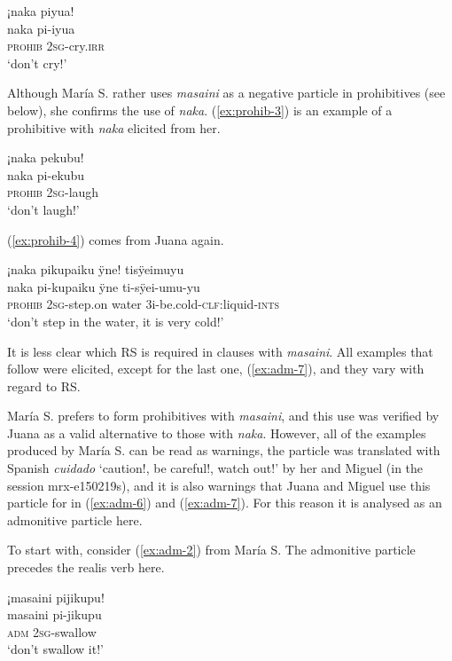 \ea\label{ex:prohib-2}
\begingl
\glpreamble ¡naka piyua!\\
\gla naka pi-iyua\\
\glb \textsc{prohib} 2\textsc{sg}-cry.\textsc{irr}\\
\glft ‘don’t cry!’
\endgl
\trailingcitation{[jxx-p150920l.041]}
\xe

Although María S. rather uses \textit{masaini} as a negative particle in prohibitives (see below), she confirms the use of \textit{naka}. (\ref{ex:prohib-3}) is an example of a prohibitive with \textit{naka} elicited from her.

\ea\label{ex:prohib-3}
\begingl
\glpreamble ¡naka pekubu!\\
\gla naka pi-ekubu\\
\glb \textsc{prohib} 2\textsc{sg}-laugh\\
\glft ‘don’t laugh!’
\endgl
\trailingcitation{[rxx-e150220s-1.08]}
\xe

(\ref{ex:prohib-4}) comes from Juana again.

\ea\label{ex:prohib-4}
\begingl
\glpreamble ¡naka pikupaiku ÿne! tisÿeimuyu\\
\gla naka pi-kupaiku ÿne ti-sÿei-umu-yu\\
\glb \textsc{prohib} 2\textsc{sg}-step.on water 3i-be.cold-\textsc{clf:}liquid-\textsc{ints}\\
\glft ‘don’t step in the water, it is very cold!’
\endgl
\trailingcitation{[jxx-e150925l-1.083-084]}
\xe

It is less clear which RS is required in clauses with \textit{masaini}.  All examples that follow were elicited, except for the last one, (\ref{ex:adm-7}), and they vary with regard to RS. 

María S. prefers to form prohibitives with \textit{masaini}, and this use was verified by Juana as a valid alternative to those with \textit{naka}. However, all of the examples produced by María S. can be read as warnings, the particle was translated with Spanish \textit{cuidado} ‘caution!, be careful!, watch out!’  by her and Miguel (in the session mrx-e150219s), and it is also warnings that Juana and Miguel use this particle for in (\ref{ex:adm-6}) and (\ref{ex:adm-7}). For this reason it is analysed as an admonitive particle here.

To start with, consider (\ref{ex:adm-2}) from María S. The admonitive particle precedes the realis verb here.

\ea\label{ex:adm-2}
\begingl
\glpreamble ¡masaini pijikupu!\\
\gla masaini pi-jikupu\\
\glb \textsc{adm} 2\textsc{sg}-swallow\\
\glft ‘don’t swallow it!’\\%
\endgl
\trailingcitation{[rxx-e141230s.076]}
\xe

